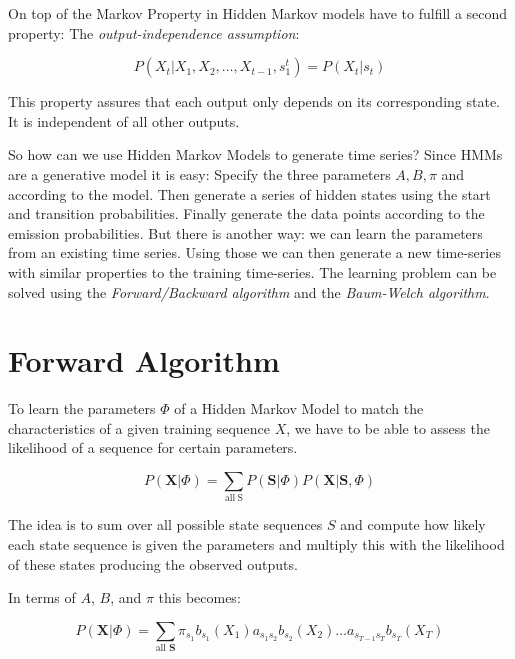 On top of the Markov Property in Hidden Markov models have to fulfill a second property: The \emph{output-independence assumption}:

\begin{equation}
P\left(X_{t} |X_{1}, X_{2}, \ldots, X_{t-1}, s_{1}^{t}\right)=P\left(X_{t} | s_{t}\right)
\end{equation}

This property assures that each output only depends on its corresponding state. It is independent of all other outputs. \parencite{huang2001spoken}

So how can we use Hidden Markov Models to generate time series? Since HMMs are a generative model it is easy: Specify the three parameters $A, B, \pi$ and according to the model. Then generate a series of hidden states using the start and transition probabilities. Finally generate the data points according to the emission probabilities. But there is another way: we can learn the parameters from an existing time series. Using those we can then generate a new time-series with similar properties to the training time-series. The learning problem can be solved using the \emph{Forward/Backward algorithm} and the \emph{Baum-Welch algorithm}.

\section{Forward Algorithm}

To learn the parameters $\Phi$ of a Hidden Markov Model to match the characteristics of a given training sequence $X$, we have to be able to assess the likelihood of a sequence for certain parameters. 

\begin{equation}
   P(\mathbf{X} | \Phi)=\sum_{\mathrm{all\:S}} P(\mathbf{S} | \Phi) P(\mathbf{X} | \mathbf{S}, \Phi) 
\end{equation}

The idea is to sum over all possible state sequences $S$ and compute how likely each state sequence is given the parameters and multiply this with the likelihood of these states producing the observed outputs. 

In terms of $A$, $B$, and $\pi$ this becomes:

\begin{equation}
   P(\mathbf{X} | \Phi)=\sum_{\text {all } \mathbf{S}} \pi_{s_{1}} b_{s_{1}}\left(X_{1}\right) a_{s_{1} s_{2}} b_{s_{2}}\left(X_{2}\right) \ldots a_{s_{T-1} s_{T}} b_{s_{T}}\left(X_{T}\right) 
\end{equation}

